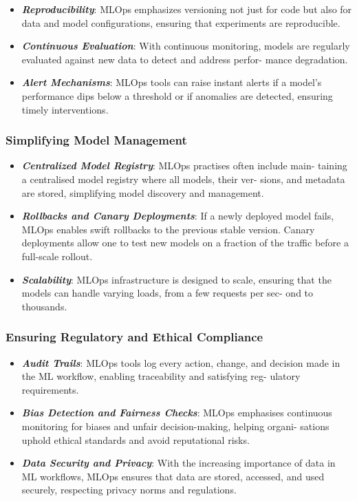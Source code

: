 \documentclass[
  letterpaper,
  DIV=11,
  numbers=noendperiod]{scrartcl}
\begin{document}
\begin{itemize}
\item
  \emph{\textbf{Reproducibility}}: MLOps emphasizes versioning not just
  for code but also for data and model configurations, ensuring that
  experiments are reproducible.
\item
  \emph{\textbf{Continuous Evaluation}}: With continuous monitoring,
  models are regularly evaluated against new data to detect and address
  perfor- mance degradation.
\item
  \emph{\textbf{Alert Mechanisms}}: MLOps tools can raise instant alerts
  if a model's performance dips below a threshold or if anomalies are
  detected, ensuring timely interventions.
\end{itemize}

\subsubsection{Simplifying Model
Management}\label{simplifying-model-management}

\begin{itemize}
\item
  \emph{\textbf{Centralized Model Registry}}: MLOps practises often
  include main- taining a centralised model registry where all models,
  their ver- sions, and metadata are stored, simplifying model discovery
  and management.
\item
  \emph{\textbf{Rollbacks and Canary Deployments}}: If a newly deployed
  model fails, MLOps enables swift rollbacks to the previous stable
  version. Canary deployments allow one to test new models on a fraction
  of the traffic before a full-scale rollout.
\item
  \emph{\textbf{Scalability}}: MLOps infrastructure is designed to
  scale, ensuring that the models can handle varying loads, from a few
  requests per sec- ond to thousands.
\end{itemize}

\subsubsection{Ensuring Regulatory and Ethical
Compliance}\label{ensuring-regulatory-and-ethical-compliance}

\begin{itemize}
\item
  \emph{\textbf{Audit Trails}}: MLOps tools log every action, change,
  and decision made in the ML workflow, enabling traceability and
  satisfying reg- ulatory requirements.
\item
  \emph{\textbf{Bias Detection and Fairness Checks}}: MLOps emphasises
  continuous monitoring for biases and unfair decision-making, helping
  organi- sations uphold ethical standards and avoid reputational risks.
\item
  \emph{\textbf{Data Security and Privacy}}: With the increasing
  importance of data in ML workflows, MLOps ensures that data are
  stored, accessed, and used securely, respecting privacy norms and
  regulations.
\end{itemize}
\end{document}
